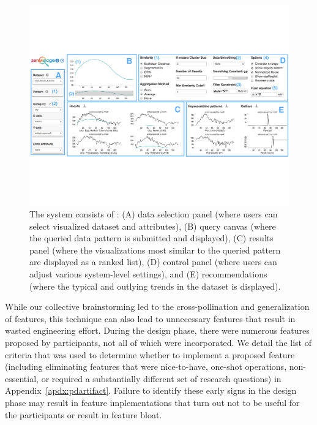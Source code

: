  \begin{figure}[ht!]
   \centering
   \vspace{-5pt}
   \includegraphics[width=0.9\linewidth]{figures/zvpp_system.pdf} %
   \vspace{-5pt}\caption{The \zvpp system consists of : (A) data selection panel (where users can select visualized dataset and attributes), (B) query canvas (where the queried data pattern is submitted and displayed), (C) results panel (where the visualizations most similar to the queried pattern are displayed as a ranked list), (D) control panel (where users can adjust various system-level settings), and (E) recommendations (where the typical and outlying trends in the dataset is displayed).}
   \label{zvOverview}
   \vspace*{-10pt}
 \end{figure}
 \par While our collective brainstorming led to the cross-pollination and generalization of features, this technique can also lead to unnecessary features that result in wasted engineering effort. During the design phase, there were numerous features proposed by participants, not all of which were incorporated. We detail the list of criteria that was used to determine whether to implement a proposed feature (including eliminating features that were nice-to-have, one-shot operations, non-essential, or required a substantially different set of research questions) in Appendix~\ref{apdx:pdartifact}. Failure to identify these early signs in the design phase may result in feature implementations that turn out not to be useful for the participants or result in feature bloat.
